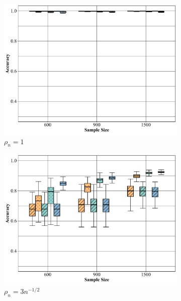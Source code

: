 \documentclass[10pt,journal,compsoc]{IEEEtran}
\numberwithin{equation}{section}
\begin{document}
\begin{figure}
\centering
\begin{subfigure}{.32\columnwidth}
\includegraphics[width=\columnwidth]{boxplot/dnb_d.pdf}%
\caption{$\rho_n = 1$}
\label{dense:1}
\end{subfigure}
\begin{subfigure}{.32\columnwidth}
\includegraphics[width=\columnwidth]{boxplot/dnb_12.pdf}%
\caption{$\rho_n = 3n^{-1/2}$}
\end{subfigure}
\begin{subfigure}{.32\columnwidth}

\end{subfigure}
\end{figure}
\end{document}
